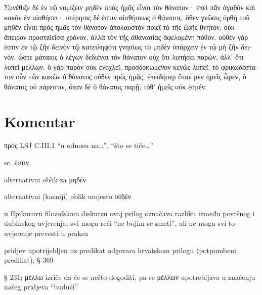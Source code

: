 {\large

\begin{greek}

\noindent Συνέθιζε δὲ ἐν τῷ νομίζειν μηδὲν πρὸς ἡμᾶς εἶναι τὸν θάνατον· ἐπεὶ πᾶν ἀγαθὸν καὶ κακὸν ἐν αἰσθήσει· στέρησις δέ ἐστιν αἰσθήσεως ὁ θάνατος. ὅθεν γνῶσις ὀρθὴ τοῦ μηθὲν εἶναι πρὸς ἡμᾶς τὸν θάνατον ἀπολαυστὸν ποιεῖ τὸ τῆς ζωῆς θνητόν, οὐκ ἄπειρον προστιθεῖσα χρόνον, ἀλλὰ τὸν τῆς ἀθανασίας ἀφελομένη πόθον. οὐθὲν γάρ ἐστιν ἐν τῷ ζῆν δεινὸν τῷ κατειληφότι γνησίως τὸ μηδὲν ὑπάρχειν ἐν τῷ μὴ ζῆν δεινόν. ὥστε μάταιος ὁ λέγων δεδιέναι τὸν θάνατον οὐχ ὅτι λυπήσει παρών, ἀλλ' ὅτι λυπεῖ μέλλων. ὃ γὰρ παρὸν οὐκ ἐνοχλεῖ, προσδοκώμενον κενῶς λυπεῖ. τὸ φρικωδέστατον οὖν τῶν κακῶν ὁ θάνατος οὐθὲν πρὸς ἡμᾶς, ἐπειδήπερ ὅταν μὲν ἡμεῖς ὦμεν, ὁ θάνατος οὐ πάρεστιν, ὅταν δὲ ὁ θάνατος παρῇ, τόθ' ἡμεῖς οὐκ ἐσμέν.

\end{greek}

}


\section*{Komentar}


\begin{description}[noitemsep]
\item[πρὸς ἡμᾶς] πρός LSJ C.III.1 ``u odnosu na\dots'', ``što se tiče\dots''
\item[ἐν αἰσθήσει] sc. ἐστιν

\end{description}

\begin{description}[noitemsep]
\item[μηθὲν] alternativni oblik za μηδέν
\end{description}


\begin{description}[noitemsep]
\item[οὐθὲν] alternativni (kasniji) oblik umjesto οὐδέν
\item[γνησίως] u Epikurovu filozofskom diskurzu ovaj prilog označava razliku između površnog i dubinskog uvjerenja; svi mogu reći ``ne bojim se smrti'', ali ne mogu svi to uvjerenje prevesti u praksu
\end{description}

\begin{description}[noitemsep]
\item[μάταιος ὁ λέγων] pridjev upotrijebljen uz predikat odgovara hrvatskom prilogu (potpumbeni predikat), § 369
\item[μέλλων] § 231; μέλλω izriče da će se nešto dogoditi, pa se μέλλων upotrebljava u značenju našeg pridjeva ``budući''
\end{description}





